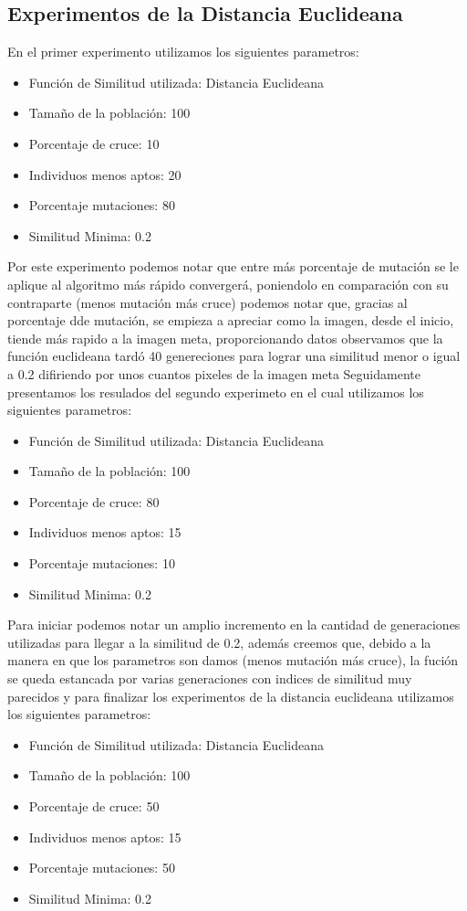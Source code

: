 \documentclass[conference]{C:/Program Files (x86)/MiKTeX 2.9/tex/latex/ltxmisc/IEEEtran}
\begin{document}
\subsection{Experimentos de la Distancia Euclideana}
\par
En el primer experimento utilizamos los siguientes parametros:
\begin{itemize}
	\item Función de Similitud utilizada: Distancia Euclideana
	\item Tamaño de la población: 100
	\item Porcentaje de cruce: 10
	\item Individuos menos aptos: 20
	\item Porcentaje mutaciones: 80
	\item Similitud Minima: 0.2
\end{itemize}
Por este experimento podemos notar que entre más porcentaje de mutación se le aplique al algoritmo más rápido convergerá, poniendolo en comparación con su contraparte (menos mutación más cruce) podemos notar que, gracias al porcentaje dde mutación, se empieza a apreciar como la imagen, desde el inicio, tiende más rapido a la imagen meta, proporcionando datos observamos que la función euclideana tardó 40 genereciones para lograr una similitud menor o igual a 0.2 difiriendo por unos cuantos pixeles de la imagen meta%
Seguidamente presentamos los resulados del segundo experimeto en el cual utilizamos los siguientes parametros:
\begin{itemize}
	\item Función de Similitud utilizada: Distancia Euclideana
	\item Tamaño de la población: 100
	\item Porcentaje de cruce: 80
	\item Individuos menos aptos: 15
	\item Porcentaje mutaciones: 10
	\item Similitud Minima: 0.2
\end{itemize}
Para iniciar podemos notar un amplio incremento en la cantidad de generaciones utilizadas para llegar a la similitud de 0.2, además creemos que, debido a la manera en que los parametros son damos (menos mutación más cruce), la fución se queda estancada por varias generaciones con indices de similitud muy parecidos
y para finalizar los experimentos de la distancia euclideana utilizamos los siguientes parametros:
\begin{itemize}
	\item Función de Similitud utilizada: Distancia Euclideana
	\item Tamaño de la población: 100
	\item Porcentaje de cruce: 50
	\item Individuos menos aptos: 15
	\item Porcentaje mutaciones: 50
	\item Similitud Minima: 0.2
\end{itemize}
\end{document}
